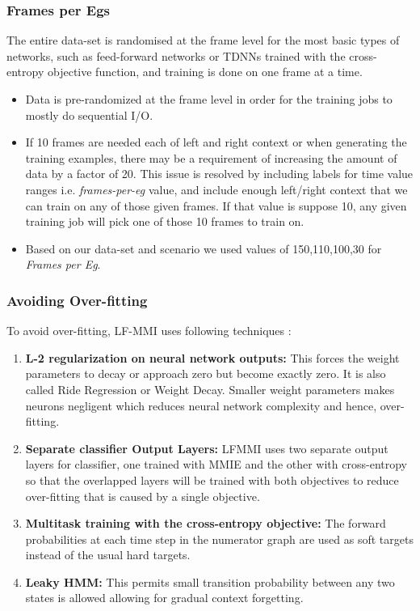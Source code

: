 \subsubsection{Frames per Egs} 
The entire data-set is randomised at the frame level for the most basic types of networks, such as feed-forward networks or TDNNs trained with the cross-entropy objective function, and training is done on one frame at a time. 
    \begin{itemize}
        \item Data is pre-randomized at the frame level in order for the training jobs to mostly do sequential I/O. 
        \item If 10 frames are needed each of left and right context or when generating the training examples, there may be a requirement of increasing the amount of data by a factor of 20. This issue is resolved by including labels for time value ranges i.e. \textit{frames-per-eg} value, and include enough left/right context that we can train on any of those given frames. If that value is suppose 10, any given training job will pick one of those 10 frames to train on. 
        \item Based on our data-set and scenario we used values of 150,110,100,30 for \textit{Frames per Eg}.
    \end{itemize}
 



\subsubsection{Avoiding Over-fitting}
To avoid over-fitting, LF-MMI uses following techniques \cite{raj_experiments_nodate}:
\begin{enumerate}
    \item \textbf{L-2 regularization on neural network outputs:} This forces the weight parameters to decay or approach zero but become exactly zero. It is also called Ride Regression or Weight Decay. Smaller weight parameters makes neurons negligent which reduces neural network complexity and hence, over-fitting. 
    \item \textbf{Separate classifier Output Layers:} LFMMI uses two separate output layers for classifier, one trained with MMIE and the other with cross-entropy so that the overlapped layers will be trained with both objectives to reduce over-fitting that is caused by a single objective.
    \item \textbf{Multitask training with the cross-entropy objective:} The forward probabilities at each time step in the numerator graph are used as soft targets instead of the usual hard targets.
    \item \textbf{Leaky HMM:} This permits small transition probability between any two states is allowed allowing for gradual context forgetting. %
\end{enumerate}

